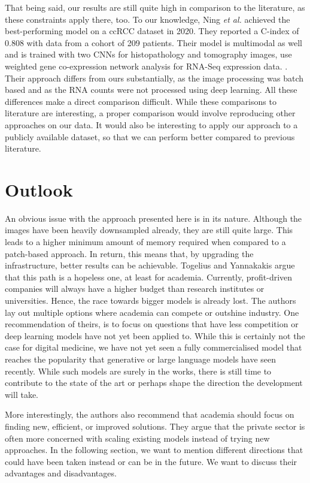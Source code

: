 That being said, our results are still quite high in comparison to the literature, as these constraints apply there, too. To our knowledge, Ning \textit{et al.} achieved the best-performing model on a ccRCC dataset in 2020. They reported a C-index of 0.808 with data from a cohort of 209 patients. Their model is multimodal as well and is trained with two CNNs for histopathology and tomography images, use weighted gene co-expression network analysis for RNA-Seq expression data. \cite{Ning2020Integrative}. Their approach differs from ours substantially, as the image processing was batch based and as the RNA counts were not processed using deep learning. All these differences make a direct comparison difficult. 
While these comparisons to literature are interesting, a proper comparison would involve reproducing other approaches on our data. It would also be interesting to apply our approach to a publicly available dataset, so that we can perform better compared to previous literature.

\section{Outlook}

An obvious issue with the approach presented here is in its nature. Although the images have been heavily downsampled already, they are still quite large. This leads to a higher minimum amount of memory required when compared to a patch-based approach. In return, this means that, by upgrading the infrastructure, better results can be achievable. 
Togelius and Yannakakis argue that this path is a hopeless one, at least for academia. Currently, profit-driven companies will always have a higher budget than research institutes or universities. \cite{Togelius2023Choose} Hence, the race towards bigger models is already lost. The authors lay out multiple options where academia can compete or outshine industry. One recommendation of theirs, is to focus on questions that have less competition or deep learning models have not yet been applied to. \cite{Togelius2023Choose} While this is certainly not the case for digital medicine, we have not yet seen a fully commercialised model that reaches the popularity that generative or large language models have seen recently. While such models are surely in the works, there is still time to contribute to the state of the art or perhaps shape the direction the development will take. 

More interestingly, the authors also recommend that academia should focus on finding new, efficient, or improved solutions.  They argue that the private sector is often more concerned with scaling existing models instead of trying new approaches. \cite{Togelius2023Choose}
In the following section, we want to mention different directions that could have been taken instead or can be in the future. We want to discuss their advantages and disadvantages. 

